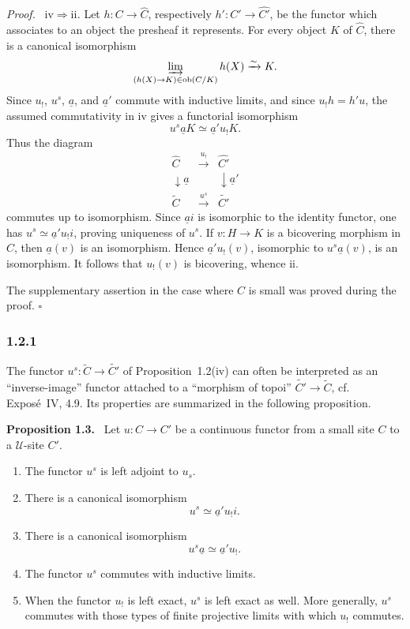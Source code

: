 \documentclass[11pt]{article}
\newcommand{\U}{\mathcal{U}}
\newcommand{\ob}{\operatorname{ob}}
\newcommand{\qedtext}{\hfill\(\square\)}
\newenvironment{statement}[1]{\par\medskip\noindent\textbf{#1.}\ }{\par\medskip}
\newenvironment{prooftext}{\par\noindent\emph{Proof.}\ }{\par\medskip}
\begin{document}
\begin{prooftext}
\emph{\(\mathrm{iv}\Rightarrow\mathrm{ii}\).} Let \(h:C\to\widehat C\), respectively \(h':C'\to\widehat{C'}\), be the functor which associates to an object the presheaf it represents. For every object \(K\) of \(\widehat C\), there is a canonical isomorphism
\[
\varinjlim_{(h(X)\to K)\in\ob(C/K)}h(X)\xrightarrow{\sim}K.
\]
Since \(u_!\), \(u^s\), \(\underline a\), and \(\underline a'\) commute with inductive limits, and since \(u_!h=h'u\), the assumed commutativity in \(\mathrm{iv}\) gives a functorial isomorphism
\[
u^s\underline aK\simeq\underline a'u_!K.
\]
Thus the diagram
\[
\begin{array}{ccc}
\widehat C&\xrightarrow{u_!}&\widehat{C'}\\
\downarrow\underline a&&\downarrow\underline a'\\
\widetilde C&\xrightarrow{u^s}&\widetilde{C'}
\end{array}
\]
commutes up to isomorphism. Since \(\underline ai\) is isomorphic to the identity functor, one has \(u^s\simeq\underline a'u_!i\), proving uniqueness of \(u^s\). If \(v:H\to K\) is a bicov\-ering morphism in \(\widehat C\), then \(\underline a(v)\) is an isomorphism. Hence \(\underline a'u_!(v)\), isomorphic to \(u^s\underline a(v)\), is an isomorphism. It follows that \(u_!(v)\) is bicov\-ering, whence \(\mathrm{ii}\).

The supplementary assertion in the case where \(C\) is small was proved during the proof. \qedtext
\end{prooftext}

\subsubsection*{1.2.1}
The functor \(u^s:\widetilde C\to\widetilde{C'}\) of Proposition~1.2(iv) can often be interpreted as an ``inverse-image'' functor attached to a ``morphism of topoi'' \(\widetilde{C'}\to\widetilde C\), cf. Expos\'e~IV, 4.9. Its properties are summarized in the following proposition.

\begin{statement}{Proposition 1.3}
Let \(u:C\to C'\) be a continuous functor from a small site \(C\) to a \(\U\)-site \(C'\).
\begin{enumerate}[label=\arabic*)]
\item The functor \(u^s\) is left adjoint to \(u_s\).
\item There is a canonical isomorphism
\[
u^s\simeq\underline a'u_!i.
\]
\item There is a canonical isomorphism
\[
u^s\underline a\simeq \underline a'u_!.
\]
\item The functor \(u^s\) commutes with inductive limits.
\item When the functor \(u_!\) is left exact, \(u^s\) is left exact as well. More generally, \(u^s\) commutes with those types of finite projective limits with which \(u_!\) commutes.
\end{enumerate}
\end{statement}
\end{document}
